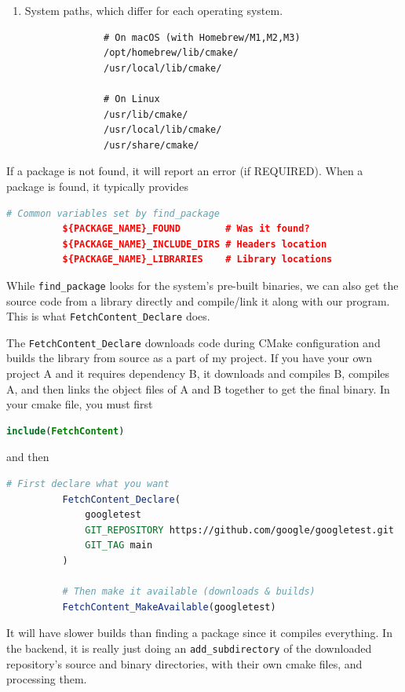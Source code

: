 \documentclass{article}
\newcounter{definition}[section]
\newcounter{code}[section]
\begin{document}
\begin{definition}
\begin{enumerate}
          \item System paths, which differ for each operating system. 
            \begin{lstlisting}
              # On macOS (with Homebrew/M1,M2,M3)
              /opt/homebrew/lib/cmake/
              /usr/local/lib/cmake/

              # On Linux
              /usr/lib/cmake/
              /usr/local/lib/cmake/
              /usr/share/cmake/
            \end{lstlisting}
        \end{enumerate}

        If a package is not found, it will report an error (if REQUIRED). When a package is found, it typically provides 
        \begin{lstlisting}[language=CMake]
          # Common variables set by find_package
          ${PACKAGE_NAME}_FOUND        # Was it found?
          ${PACKAGE_NAME}_INCLUDE_DIRS # Headers location
          ${PACKAGE_NAME}_LIBRARIES    # Library locations 
        \end{lstlisting}
      \end{definition}

      While \texttt{find\_package} looks for the system's pre-built binaries, we can also get the source code from a library directly and compile/link it along with our program. This is what \texttt{FetchContent\_Declare} does. 

      \begin{definition}
        \label{def:fetch-content}
        The \texttt{FetchContent\_Declare} downloads code during CMake configuration and builds the library from source as a part of my project. If you have your own project A and it requires dependency B, it downloads and compiles B, compiles A, and then links the object files of A and B together to get the final binary. In your cmake file, you must first 
        \begin{lstlisting}[language=CMake]
          include(FetchContent)
        \end{lstlisting}
        and then 
        \begin{lstlisting}[language=CMake]
          # First declare what you want
          FetchContent_Declare(
              googletest
              GIT_REPOSITORY https://github.com/google/googletest.git
              GIT_TAG main
          )

          # Then make it available (downloads & builds)
          FetchContent_MakeAvailable(googletest)
        \end{lstlisting}
        It will have slower builds than finding a package since it compiles everything. In the backend, it is really just doing an \texttt{add\_subdirectory} of the downloaded repository's source and binary directories, with their own cmake files, and processing them. 
      \end{definition}
\end{document}
